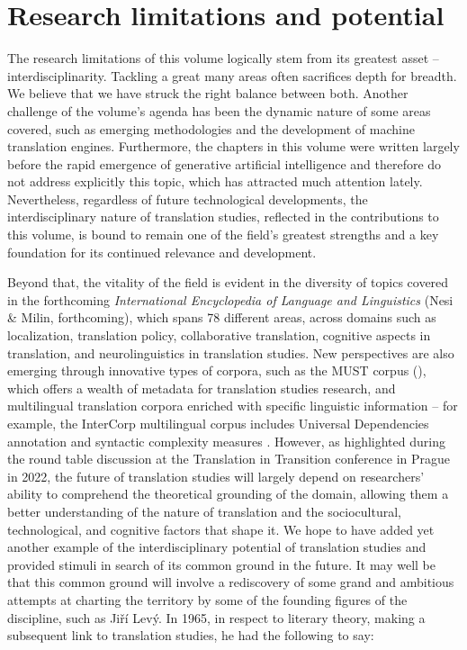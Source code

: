 \documentclass[output=paper]{langscibook}
\begin{document}
\section{Research limitations and potential}

The research limitations of this volume logically stem from its greatest asset – interdisciplinarity. Tackling a great many areas often sacrifices depth for breadth. We believe that we have struck the right balance between both. Another challenge of the volume’s agenda has been the dynamic nature of some areas covered, such as emerging methodologies and the development of machine translation engines. Furthermore, the chapters in this volume were written largely before the rapid emergence of generative artificial intelligence and therefore do not address explicitly this topic, which has attracted much attention lately. Nevertheless, regardless of future technological developments, the interdisciplinary nature of translation studies, reflected in the contributions to this volume, is bound to remain one of the field’s greatest strengths and a key foundation for its continued relevance and development.

 Beyond that, the vitality of the field is evident in the diversity of topics covered in the forthcoming \textit{International Encyclopedia of Language and Linguistics} (Nesi \& Milin, forthcoming), which spans 78 different areas, across domains such as localization, translation policy, collaborative translation, cognitive aspects in translation, and neurolinguistics in translation studies. New perspectives are also emerging through innovative types of corpora, such as the MUST corpus (\citealt{GrangerLefer2020}), which offers a wealth of metadata for translation studies research, and multilingual translation corpora enriched with specific linguistic information – for example, the InterCorp multilingual corpus includes Universal Dependencies annotation and syntactic complexity measures \citep{RosenEtAl2024}. However, as highlighted during the round table discussion at the Translation in Transition conference in Prague in 2022, the future of translation studies will largely depend on researchers’ ability to comprehend the theoretical grounding of the domain, allowing them a better understanding of the nature of translation and the sociocultural, technological, and cognitive factors that shape it. We hope to have added yet another example of the interdisciplinary potential of translation studies and provided stimuli in search of its common ground in the future. It may well be that this common ground will involve a rediscovery of some grand and ambitious attempts at charting the territory by some of the founding figures of the discipline, such as Jiří Levý.  {In 1965}, in respect to literary theory, making a subsequent link to translation studies, he had the following to say:
\end{document}
